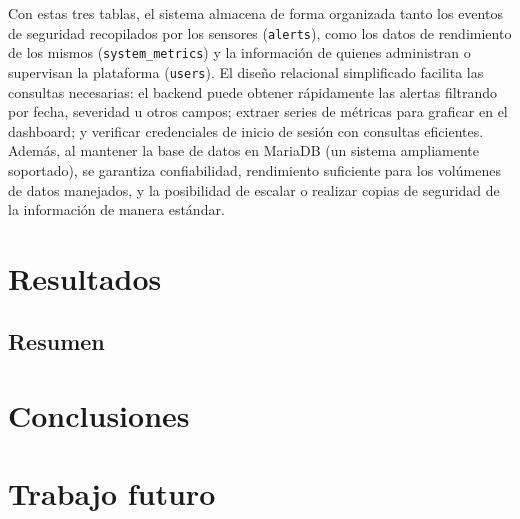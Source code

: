 \documentclass[11pt,a4paper,twoside]{report}
\begin{document}
Con estas tres tablas, el sistema almacena de forma organizada tanto los eventos de seguridad recopilados por los sensores (\texttt{alerts}), como los datos de rendimiento de los mismos (\texttt{system\_metrics}) y la información de quienes administran o supervisan la plataforma (\texttt{users}). El diseño relacional simplificado facilita las consultas necesarias: el backend puede obtener rápidamente las alertas filtrando por fecha, severidad u otros campos; extraer series de métricas para graficar en el dashboard; y verificar credenciales de inicio de sesión con consultas eficientes. Además, al mantener la base de datos en MariaDB (un sistema ampliamente soportado), se garantiza confiabilidad, rendimiento suficiente para los volúmenes de datos manejados, y la posibilidad de escalar o realizar copias de seguridad de la información de manera estándar.

\clearpage
\null
\thispagestyle{empty}
\newpage
\chapter{Resultados}

\section{Resumen}


\clearpage
\null
\thispagestyle{empty}
\newpage
\thispagestyle{empty}
\chapter*{Conclusiones}


\clearpage
\null
\thispagestyle{empty}
\newpage
\chapter*{Trabajo futuro}

\cleardoublepage %
\end{document}
